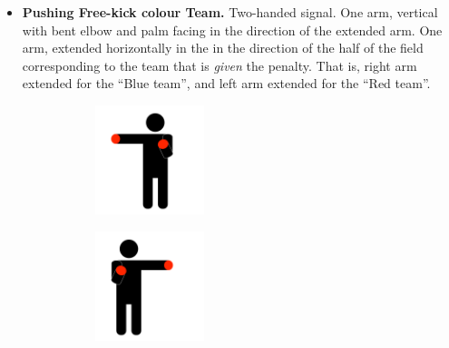\begin{itemize}
            \item \textbf{Pushing Free-kick \textlangle{}colour\textrangle{}  Team.}
            Two-handed signal. One arm, vertical with bent elbow and palm facing in the direction of the extended arm. One arm, extended horizontally in the in the direction of the half of the field corresponding to the team that is \emph{given} the penalty. That is, right arm extended for the ``Blue team'', and left arm extended for the ``Red team''.
            \begin{figure}[ht!]
                \centering
                \begin{subfigure}{.33\textwidth}
                  \includegraphics[height=120px]{figs/referee-signals/pushing.png}
                \end{subfigure}
                \begin{subfigure}{.33\textwidth}
                  \includegraphics[height=120px]{figs/referee-signals/pushing-flipped.png}
                \end{subfigure}
            \end{figure}


\end{itemize}
